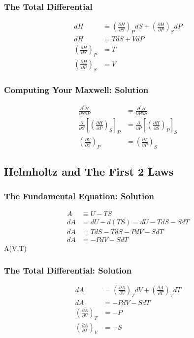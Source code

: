 \documentclass{article}
\newcommand{\be}{\begin{equation}}
\newcommand{\ee}{\end{equation}}
\begin{document}
\subsubsection{The Total Differential}
\be
\begin{split}
    dH &= \left( \frac{\partial H}{\partial S} \right)_PdS + \left( \frac{\partial H}{\partial P}  \right)_S dP\\
     dH &= TdS + VdP \\
    \left( \frac{\partial H}{\partial S} \right)_P &= T \\
    \left( \frac{\partial H}{\partial P}  \right)_S &= V
\end{split}
\ee

\subsubsection{Computing Your Maxwell: Solution}

\be
\begin{split}
\frac{\partial ^2 H}{\partial S \partial P} &= \frac{\partial ^2 H}{\partial P \partial S} \\
\frac{\partial }{\partial S}\left[\left(\frac{\partial H}{\partial P}\right)_S\right]_P &= \frac{\partial}{\partial P}\left[\left(\frac{\partial H }{\partial S}\right)_P\right]_S \\
 \left(\frac{\partial V}{\partial S}\right)_P &=
\left(\frac{\partial T}{\partial P}\right)_S
\end{split}
\ee

\subsection{Helmholtz and The First 2 Laws}

\subsubsection{The Fundamental Equation: Solution}
\be
    \begin{split}
        A &\equiv  U - TS \\
        dA &= dU - d(TS) = dU -TdS - SdT \\
        dA &= TdS - TdS - PdV - SdT \\
        dA &= -PdV - SdT
    \end{split}
\ee
A(V,T)

\subsubsection{The Total Differential: Solution}
\be
\begin{split}
    dA &= \left( \frac{\partial A}{\partial V} \right)_T dV + \left( \frac{\partial A}{\partial T}  \right)_V dT\\
     dA &= -PdV -SdT \\
    \left( \frac{\partial A}{\partial V} \right)_T &= -P \\
    \left( \frac{\partial A}{\partial T}  \right)_V &= -S
\end{split}
\ee
\end{document}
